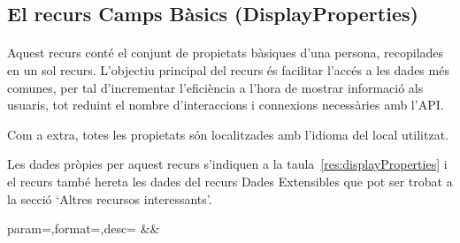 \subsection{El recurs Camps Bàsics (DisplayProperties)}

    \paragraph{}
    Aquest recurs conté el conjunt de propietats bàsiques d'una persona, recopilades en un sol recurs. L'objectiu principal del recurs és facilitar l'accés a les dades més comunes, per tal d'incrementar l'eficiència a l'hora de mostrar informació als usuaris, tot reduint el nombre d'interaccions i connexions necessàries amb l'API.

    Com a extra, totes les propietats són localitzades amb l'idioma del local utilitzat.

    Les dades pròpies per aquest recurs s'indiquen a la taula~\ref{res:displayProperties} i el recurs també hereta les dades del recurs Dades Extensibles que pot ser trobat a la secció `Altres recursos interessants'.

    \begin{center}
             {param=\param,format=\format,desc=\desc}
             {\param&\format&\desc}
     \end{center}
